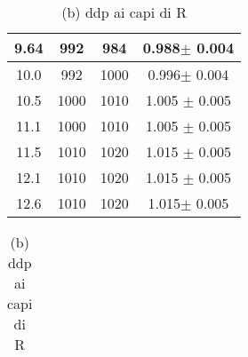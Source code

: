 \documentclass[a4paper]{article}
\theoremstyle{definition}
\begin{document}
\begin{table}[!htbp]
{\begin{minipage}{.5\linewidth}
\begin{tabular}{c|cc|c}
       \hline
       9.64& 992& 984 & 0.988\(\pm\)   0.004\\
       \hline
       10.0& 992& 1000 & 0.996\(\pm\)   0.004\\
       \hline
       10.5& 1000& 1010 & 1.005 \(\pm\)  0.005\\
       \hline
       11.1& 1000& 1010 & 1.005 \(\pm\)  0.005\\
       \hline
       11.5& 1010& 1020 & 1.015 \(\pm\)  0.005\\
       \hline
       12.1& 1010& 1020 & 1.015 \(\pm\)  0.005\\
       \hline
       12.6& 1010& 1020 & 1.015\(\pm\)   0.005\\
       \hline
       \hline
    \end{tabular}
    \end{minipage}%
    \begin{minipage}{.7\linewidth}
      \centering
        \captionsetup{labelformat=empty}

    	 \caption{(b) ddp ai capi di R}
            \begin{tabular}{c|cc|c}


\end{tabular}
\end{minipage}}
\end{table}
\end{document}
